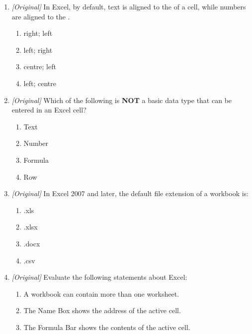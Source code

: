 \documentclass[11pt]{article}
\begin{document}
\begin{enumerate}[label=\textbf{Q\arabic*.}, leftmargin=*]
\begin{enumerate}[label=\Alph*.]
    \item B5
    \item A1:C10
    \item \$A\$1
    \item =SUM(A1:A2)
  \end{enumerate}
\item \textit{[Original]} In Excel, by default, text is aligned to the
  \underline{\hspace{1.6cm}} of a cell, while numbers are aligned to the
  \underline{\hspace{1.6cm}}.
  \begin{enumerate}[label=\Alph*.]
    \item right; left
    \item left; right
    \item centre; left
    \item left; centre
  \end{enumerate}
\item \textit{[Original]} Which of the following is \textbf{NOT} a basic data
  type that can be entered in an Excel cell?
  \begin{enumerate}[label=\Alph*.]
    \item Text
    \item Number
    \item Formula
    \item Row
  \end{enumerate}
\item \textit{[Original]} In Excel 2007 and later, the default file extension
  of a workbook is:
  \begin{enumerate}[label=\Alph*.]
    \item .xls
    \item .xlsx
    \item .docx
    \item .csv
  \end{enumerate}
\item \textit{[Original]} Evaluate the following statements about Excel:
  \begin{enumerate}[label=\Roman*.]
    \item A workbook can contain more than one worksheet.
    \item The Name Box shows the address of the active cell.
    \item The Formula Bar shows the contents of the active cell.
  \end{enumerate}
  \begin{enumerate}[label=\Alph*.]

\end{enumerate}
\end{enumerate}
\end{document}
